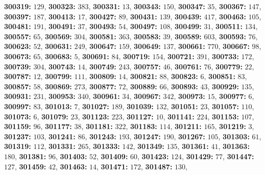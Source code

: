 \textsf{\bfseries 300319:} $129$, \textsf{\bfseries 300323:} $383$, \textsf{\bfseries 300331:} $13$, \textsf{\bfseries 300343:} $150$, \textsf{\bfseries 300347:} $35$, \textsf{\bfseries 300367:} $147$, \textsf{\bfseries 300397:} $187$, \textsf{\bfseries 300413:} $17$, \textsf{\bfseries 300427:} $89$, \textsf{\bfseries 300431:} $139$, \textsf{\bfseries 300439:} $417$, \textsf{\bfseries 300463:} $105$, \textsf{\bfseries 300481:} $191$, \textsf{\bfseries 300491:} $37$, \textsf{\bfseries 300493:} $54$, \textsf{\bfseries 300497:} $108$, \textsf{\bfseries 300499:} $31$, \textsf{\bfseries 300511:} $134$, \textsf{\bfseries 300557:} $65$, \textsf{\bfseries 300569:} $304$, \textsf{\bfseries 300581:} $363$, \textsf{\bfseries 300583:} $39$, \textsf{\bfseries 300589:} $603$, \textsf{\bfseries 300593:} $76$, \textsf{\bfseries 300623:} $52$, \textsf{\bfseries 300631:} $249$, \textsf{\bfseries 300647:} $159$, \textsf{\bfseries 300649:} $137$, \textsf{\bfseries 300661:} $770$, \textsf{\bfseries 300667:} $98$, \textsf{\bfseries 300673:} $65$, \textsf{\bfseries 300683:} $5$, \textsf{\bfseries 300691:} $84$, \textsf{\bfseries 300719:} $154$, \textsf{\bfseries 300721:} $391$, \textsf{\bfseries 300733:} $172$, \textsf{\bfseries 300739:} $304$, \textsf{\bfseries 300743:} $14$, \textsf{\bfseries 300749:} $243$, \textsf{\bfseries 300757:} $46$, \textsf{\bfseries 300761:} $76$, \textsf{\bfseries 300779:} $22$, \textsf{\bfseries 300787:} $12$, \textsf{\bfseries 300799:} $111$, \textsf{\bfseries 300809:} $14$, \textsf{\bfseries 300821:} $88$, \textsf{\bfseries 300823:} $6$, \textsf{\bfseries 300851:} $83$, \textsf{\bfseries 300857:} $58$, \textsf{\bfseries 300869:} $273$, \textsf{\bfseries 300877:} $72$, \textsf{\bfseries 300889:} $66$, \textsf{\bfseries 300893:} $43$, \textsf{\bfseries 300929:} $135$, \textsf{\bfseries 300931:} $231$, \textsf{\bfseries 300953:} $340$, \textsf{\bfseries 300961:} $34$, \textsf{\bfseries 300967:} $342$, \textsf{\bfseries 300973:} $15$, \textsf{\bfseries 300977:} $6$, \textsf{\bfseries 300997:} $83$, \textsf{\bfseries 301013:} $7$, \textsf{\bfseries 301027:} $189$, \textsf{\bfseries 301039:} $132$, \textsf{\bfseries 301051:} $23$, \textsf{\bfseries 301057:} $110$, \textsf{\bfseries 301073:} $6$, \textsf{\bfseries 301079:} $23$, \textsf{\bfseries 301123:} $223$, \textsf{\bfseries 301127:} $10$, \textsf{\bfseries 301141:} $224$, \textsf{\bfseries 301153:} $107$, \textsf{\bfseries 301159:} $96$, \textsf{\bfseries 301177:} $38$, \textsf{\bfseries 301181:} $322$, \textsf{\bfseries 301183:} $114$, \textsf{\bfseries 301211:} $165$, \textsf{\bfseries 301219:} $3$, \textsf{\bfseries 301237:} $103$, \textsf{\bfseries 301241:} $86$, \textsf{\bfseries 301243:} $193$, \textsf{\bfseries 301247:} $190$, \textsf{\bfseries 301267:} $105$, \textsf{\bfseries 301303:} $61$, \textsf{\bfseries 301319:} $112$, \textsf{\bfseries 301331:} $265$, \textsf{\bfseries 301333:} $142$, \textsf{\bfseries 301349:} $135$, \textsf{\bfseries 301361:} $41$, \textsf{\bfseries 301363:} $180$, \textsf{\bfseries 301381:} $96$, \textsf{\bfseries 301403:} $52$, \textsf{\bfseries 301409:} $60$, \textsf{\bfseries 301423:} $124$, \textsf{\bfseries 301429:} $77$, \textsf{\bfseries 301447:} $127$, \textsf{\bfseries 301459:} $42$, \textsf{\bfseries 301463:} $14$, \textsf{\bfseries 301471:} $172$, \textsf{\bfseries 301487:} $130$, 
